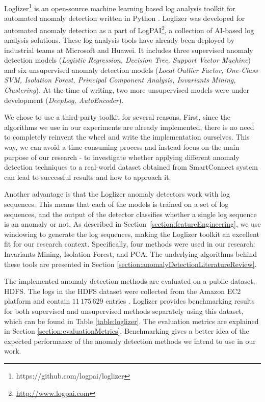 Loglizer\footnote{https://github.com/logpai/loglizer} is an open-source machine learning based log analysis toolkit for automated anomaly detection written in Python \cite{he2016}. Loglizer was developed for automated anomaly detection as a part of LogPAI\footnote{\url{http://www.logpai.com}}, a collection of AI-based log analysis solutions. These log analysis tools have already been deployed by industrial teams at Microsoft and Huawei. It includes three supervised anomaly detection models (\textit{Logistic Regression, Decision Tree, Support Vector Machine}) and six unsupervised anomaly detection models (\textit{Local Outlier Factor, One-Class SVM, Isolation Forest, Principal Component Analysis, Invariants Mining, Clustering}). At the time of writing, two more unsupervised models were under development (\textit{DeepLog, AutoEncoder}). 

We chose to use a third-party toolkit for several reasons. First, since the algorithms we use in our experiments are already implemented, there is no need to completely reinvent the wheel and write the implementation ourselves. This way, we can avoid a time-consuming process and instead focus on the main purpose of our research - to investigate whether applying different anomaly detection techniques to a real-world dataset obtained from SmartConnect system can lead to successful results and how to approach it.

Another advantage is that the Loglizer anomaly detectors work with log sequences. This means that each of the models is trained on a set of log sequences, and the output of the detector classifies whether a single log sequence is an anomaly or not. As described in Section~\ref{section:featureEngineering}, we use windowing to generate the log sequences, making the Loglizer toolkit an excellent fit for our research context. Specifically, four methods were used in our research: Invariants Mining, Isolation Forest, and PCA. The underlying algorithms behind these tools are presented in Section \ref{section:anomalyDetectionLiteratureReview}.

The implemented anomaly detection methods are evaluated on a public dataset, HDFS. The logs in the HDFS dataset were collected from the Amazon EC2 platform and contain $11\,175\,629$ entries \cite{xu2009}. Loglizer provides benchmarking results for both supervised and unsupervised methods separately using this dataset, which can be found in Table \ref{table:loglizer}. The evaluation metrics are explained in Section \ref{section:evaluationMetrics}. Benchmarking gives a better idea of the expected performance of the anomaly detection methods we intend to use in our work.  

